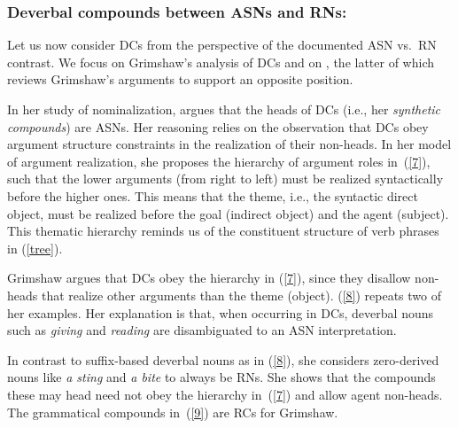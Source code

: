 \documentclass[output=paper]{langsci/langscibook}
\begin{document}
\subsubsection{Deverbal compounds between ASNs and RNs: \cite{grimshaw:90}}\label{sec:prev:lit:DCs}
Let us now consider DCs from the perspective of the documented ASN vs.\ RN contrast. We focus  on Grimshaw's analysis of DCs and on \cite{borer:13}, the latter of which reviews Grimshaw's arguments to support an opposite position.

In her study of nominalization, \cite{grimshaw:90} argues that the heads of DCs (i.e., her \textit{synthetic compounds})  are ASNs.  Her reasoning relies on the observation that DCs obey argument structure constraints in the realization of their non-heads. In her  model of argument realization, she proposes the hierarchy of argument roles in~(\ref{7}), such that the lower arguments (from right to left) must be realized syntactically before the higher ones.
This means that the theme, i.e., the syntactic direct object, must be realized before the goal (indirect object) and the agent (subject).  {This thematic hierarchy reminds us of the constituent structure of verb phrases in (\ref{tree}).}

\begin{exe}
\end{exe}

Grimshaw argues that DCs obey the hierarchy in (\ref{7}), since they disallow non-heads that realize other arguments than the theme (object). (\ref{8}) repeats two of her examples. Her explanation is that, when occurring in DCs, deverbal nouns such as  \textit{giving} and \textit{reading} are disambiguated to an ASN interpretation. 
\begin{exe}
\end{exe}
In contrast to suffix-based deverbal nouns as in (\ref{8}), she considers zero-derived nouns like \textit{a sting} and \textit{a bite} to always be RNs. She shows that the compounds these may head need not obey the hierarchy in~(\ref{7}) and allow agent non-heads. The grammatical compounds in~(\ref{9}) are RCs for Grimshaw. 
\begin{exe}
\end{exe}
\end{document}
